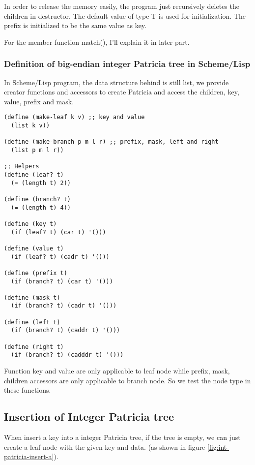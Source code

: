 \documentclass{article}
\begin{document}
In order to release the memory easily, the program just recursively
deletes the children in destructor. The default value of type T
is used for initialization. The prefix is initialized to be the same
value as key.

For the member function match(), I'll explain it in later part.

\subsubsection*{Definition of big-endian integer Patricia tree in
Scheme/Lisp}

In Scheme/Lisp program, the data structure behind is still list, we
provide creator functions and accessors to create Patricia and access
the children, key, value, prefix and mask.

\lstset{language=lisp}
\begin{lstlisting}
(define (make-leaf k v) ;; key and value
  (list k v))

(define (make-branch p m l r) ;; prefix, mask, left and right
  (list p m l r))

;; Helpers
(define (leaf? t)
  (= (length t) 2))

(define (branch? t)
  (= (length t) 4))

(define (key t)
  (if (leaf? t) (car t) '()))

(define (value t)
  (if (leaf? t) (cadr t) '()))

(define (prefix t)
  (if (branch? t) (car t) '()))

(define (mask t)
  (if (branch? t) (cadr t) '()))

(define (left t)
  (if (branch? t) (caddr t) '()))

(define (right t)
  (if (branch? t) (cadddr t) '()))
\end{lstlisting}

Function key and value are only applicable to leaf node while prefix,
mask, children accessors are only applicable to branch node. So we
test the node type in these functions.

\subsection{Insertion of Integer Patricia tree}
When insert a key into a integer Patricia tree, if the tree is empty,
we can just create a leaf node with the given key and data. (as shown
in figure \ref{fig:int-patricia-insert-a}).
\end{document}
